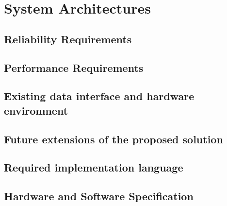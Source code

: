 \section{System Architectures}

\subsection{Reliability Requirements}
\subsection{Performance Requirements}
\subsection{Existing data interface and hardware environment}
\subsection{Future extensions of the proposed solution}
\subsection{Required implementation language}
\subsection{Hardware and Software Specification}